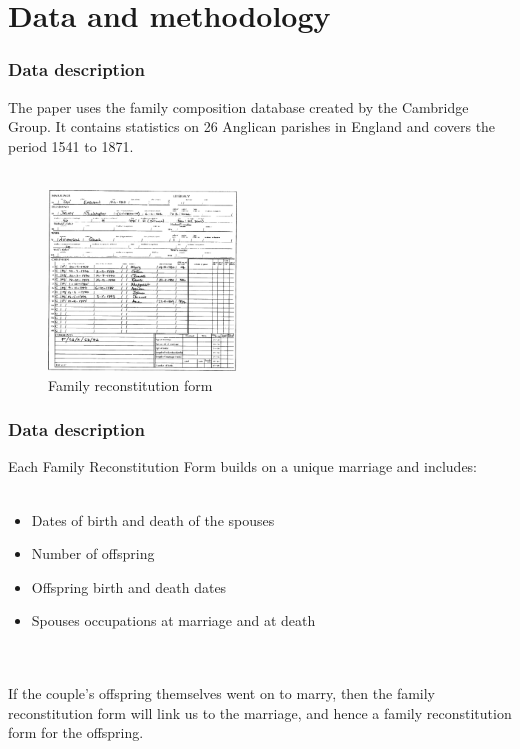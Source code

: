 \documentclass[pdftex,12pt,xcolor=pdftex,table]{beamer}
\begin{document}


\section{Data and methodology}
\begin{frame}
\frametitle{Data description}
 The paper uses the family composition database created by the Cambridge Group. It contains statistics on 26 Anglican parishes in England and covers the period 1541 to 1871.\\~\\
 \begin{figure}[h!]
    \centering
    \includegraphics[width=5cm]{formato_constitucion_familia.png}
    \caption{Family reconstitution form}
 \end{figure}

\end{frame}

\begin{frame}
\frametitle{Data description}
 Each Family Reconstitution Form builds on a unique marriage and includes:\\~\\
 \begin{itemize}
    \item Dates of birth and death of the spouses
    \item Number of offspring
    \item Offspring birth and death dates
    \item Spouses occupations at marriage and at death
  \end{itemize}\\~\\
 If the couple’s offspring themselves went on to marry, then the family reconstitution form will link us to the marriage, and hence a family reconstitution form for the offspring. 

\end{frame}
\end{document}
